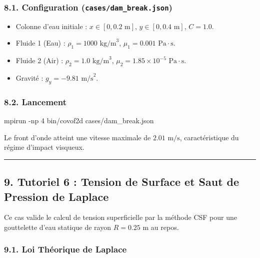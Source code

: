\documentclass[
  french,
]{article}
\newenvironment{Shaded}{}{}
\newcommand{\AttributeTok}[1]{\textcolor[rgb]{0.49,0.56,0.16}{#1}}
\newcommand{\ExtensionTok}[1]{#1}
\newcommand{\NormalTok}[1]{#1}
\providecommand{\tightlist}{%
  \setlength{\itemsep}{0pt}\setlength{\parskip}{0pt}}
\begin{document}
\subsubsection{\texorpdfstring{8.1. Configuration
(\texttt{cases/dam\_break.json})}{8.1. Configuration (cases/dam\_break.json)}}\label{configuration-casesdam_break.json}

\begin{itemize}
\tightlist
\item
  Colonne d'eau initiale : \(x \in [0, 0.2\text{ m}]\),
  \(y \in [0, 0.4\text{ m}]\), \(C = 1.0\).
\item
  Fluide 1 (Eau) : \(\rho_1 = 1000\text{ kg/m}^3\),
  \(\mu_1 = 0.001\text{ Pa}\cdot\text{s}\).
\item
  Fluide 2 (Air) : \(\rho_2 = 1.0\text{ kg/m}^3\),
  \(\mu_2 = 1.85 \times 10^{-5}\text{ Pa}\cdot\text{s}\).
\item
  Gravité : \(g_y = -9.81\text{ m/s}^2\).
\end{itemize}

\subsubsection{8.2. Lancement}\label{lancement-2}

\begin{Shaded}
\begin{Highlighting}[]
\ExtensionTok{mpirun} \AttributeTok{{-}np}\NormalTok{ 4 bin/covof2d cases/dam\_break.json}
\end{Highlighting}
\end{Shaded}

Le front d'onde atteint une vitesse maximale de \(2.01\text{ m/s}\),
caractéristique du régime d'impact visqueux.

\begin{center}\rule{0.5\linewidth}{0.5pt}\end{center}

\subsection{9. Tutoriel 6 : Tension de Surface et Saut de Pression de
Laplace}\label{tutoriel-6-tension-de-surface-et-saut-de-pression-de-laplace}

Ce cas valide le calcul de tension superficielle par la méthode CSF pour
une gouttelette d'eau statique de rayon \(R = 0.25\text{ m}\) au repos.

\subsubsection{9.1. Loi Théorique de
Laplace}\label{loi-thuxe9orique-de-laplace}
\end{document}
